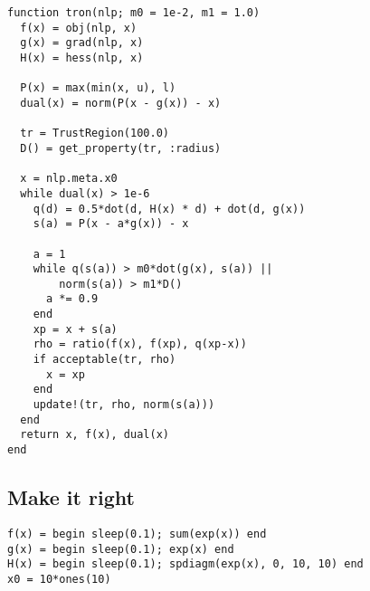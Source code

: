 \begin{frame}
\begin{verbatim}
function tron(nlp; m0 = 1e-2, m1 = 1.0)
  f(x) = obj(nlp, x)
  g(x) = grad(nlp, x)
  H(x) = hess(nlp, x)

  P(x) = max(min(x, u), l)
  dual(x) = norm(P(x - g(x)) - x)

  tr = TrustRegion(100.0)
  D() = get_property(tr, :radius)

  x = nlp.meta.x0
  while dual(x) > 1e-6
    q(d) = 0.5*dot(d, H(x) * d) + dot(d, g(x))
    s(a) = P(x - a*g(x)) - x

    a = 1
    while q(s(a)) > m0*dot(g(x), s(a)) ||
        norm(s(a)) > m1*D()
      a *= 0.9
    end
    xp = x + s(a)
    rho = ratio(f(x), f(xp), q(xp-x))
    if acceptable(tr, rho)
      x = xp
    end
    update!(tr, rho, norm(s(a)))
  end
  return x, f(x), dual(x)
end
\end{verbatim}
\end{frame}

\subsection{Make it right}

\begin{frame}[fragile]
  \begin{verbatim}
f(x) = begin sleep(0.1); sum(exp(x)) end
g(x) = begin sleep(0.1); exp(x) end
H(x) = begin sleep(0.1); spdiagm(exp(x), 0, 10, 10) end
x0 = 10*ones(10)
\end{verbatim}
\end{frame}


